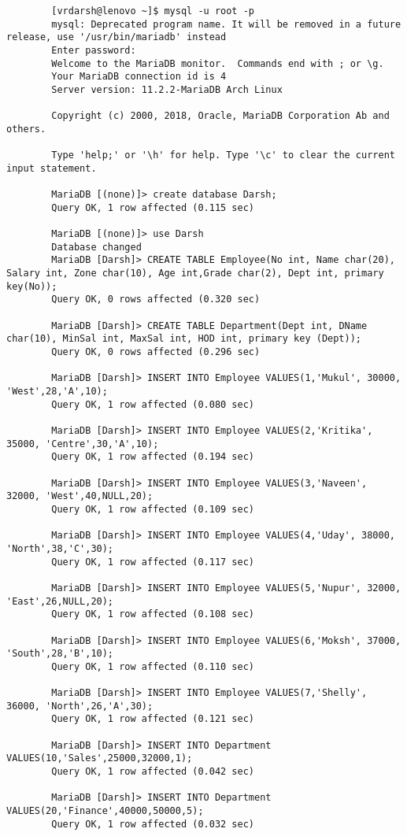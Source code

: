 \documentclass[
a4paper]{article}
\begin{document}
	\begin{lstlisting}
		[vrdarsh@lenovo ~]$ mysql -u root -p
		mysql: Deprecated program name. It will be removed in a future release, use '/usr/bin/mariadb' instead
		Enter password: 
		Welcome to the MariaDB monitor.  Commands end with ; or \g.
		Your MariaDB connection id is 4
		Server version: 11.2.2-MariaDB Arch Linux
		
		Copyright (c) 2000, 2018, Oracle, MariaDB Corporation Ab and others.
		
		Type 'help;' or '\h' for help. Type '\c' to clear the current input statement.
		
		MariaDB [(none)]> create database Darsh;
		Query OK, 1 row affected (0.115 sec)
		
		MariaDB [(none)]> use Darsh
		Database changed
		MariaDB [Darsh]> CREATE TABLE Employee(No int, Name char(20), Salary int, Zone char(10), Age int,Grade char(2), Dept int, primary key(No));
		Query OK, 0 rows affected (0.320 sec)
		
		MariaDB [Darsh]> CREATE TABLE Department(Dept int, DName char(10), MinSal int, MaxSal int, HOD int, primary key (Dept));
		Query OK, 0 rows affected (0.296 sec)
		
		MariaDB [Darsh]> INSERT INTO Employee VALUES(1,'Mukul', 30000, 'West',28,'A',10);
		Query OK, 1 row affected (0.080 sec)
		
		MariaDB [Darsh]> INSERT INTO Employee VALUES(2,'Kritika', 35000, 'Centre',30,'A',10);
		Query OK, 1 row affected (0.194 sec)
		
		MariaDB [Darsh]> INSERT INTO Employee VALUES(3,'Naveen', 32000, 'West',40,NULL,20);
		Query OK, 1 row affected (0.109 sec)
		
		MariaDB [Darsh]> INSERT INTO Employee VALUES(4,'Uday', 38000, 'North',38,'C',30);
		Query OK, 1 row affected (0.117 sec)
		
		MariaDB [Darsh]> INSERT INTO Employee VALUES(5,'Nupur', 32000, 'East',26,NULL,20);
		Query OK, 1 row affected (0.108 sec)
		
		MariaDB [Darsh]> INSERT INTO Employee VALUES(6,'Moksh', 37000, 'South',28,'B',10);
		Query OK, 1 row affected (0.110 sec)
		
		MariaDB [Darsh]> INSERT INTO Employee VALUES(7,'Shelly', 36000, 'North',26,'A',30);
		Query OK, 1 row affected (0.121 sec)
		
		MariaDB [Darsh]> INSERT INTO Department VALUES(10,'Sales',25000,32000,1);
		Query OK, 1 row affected (0.042 sec)
		
		MariaDB [Darsh]> INSERT INTO Department VALUES(20,'Finance',40000,50000,5);
		Query OK, 1 row affected (0.032 sec)
		

\end{lstlisting}
\end{document}
